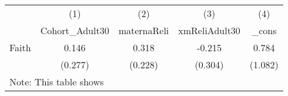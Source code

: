 {
\def\sym#1{\ifmmode^{#1}\else\(^{#1}\)\fi}
\begin{tabular}{l*{4}{c}}
\hline\hline
            &\multicolumn{1}{c}{(1)}&\multicolumn{1}{c}{(2)}&\multicolumn{1}{c}{(3)}&\multicolumn{1}{c}{(4)}\\
            &\multicolumn{1}{c}{Cohort\_Adult30}&\multicolumn{1}{c}{maternaReli}&\multicolumn{1}{c}{xmReliAdult30}&\multicolumn{1}{c}{\_cons}\\
\hline
Faith       &       0.146         &       0.318         &      -0.215         &       0.784         \\
            &     (0.277)         &     (0.228)         &     (0.304)         &     (1.082)         \\
\hline\hline
\multicolumn{5}{l}{\footnotesize Note: This table shows}\\
\end{tabular}
}
